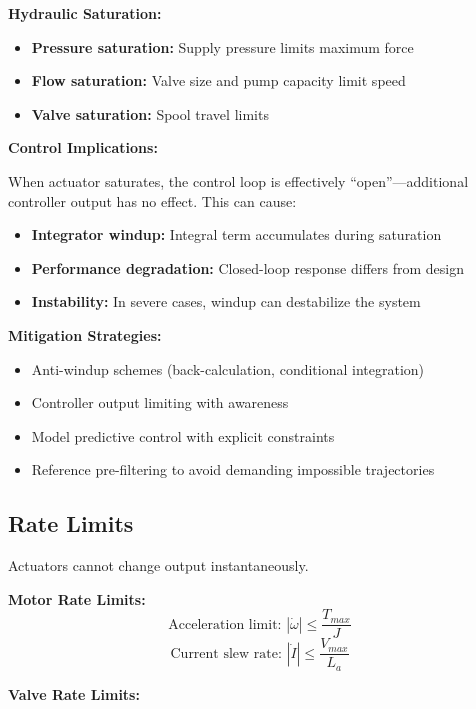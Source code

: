 \textbf{Hydraulic Saturation:}
\begin{itemize}
    \item \textbf{Pressure saturation:} Supply pressure limits maximum force
    \item \textbf{Flow saturation:} Valve size and pump capacity limit speed
    \item \textbf{Valve saturation:} Spool travel limits
\end{itemize}

\textbf{Control Implications:}

When actuator saturates, the control loop is effectively ``open''---additional controller output has no effect. This can cause:
\begin{itemize}
    \item \textbf{Integrator windup:} Integral term accumulates during saturation
    \item \textbf{Performance degradation:} Closed-loop response differs from design
    \item \textbf{Instability:} In severe cases, windup can destabilize the system
\end{itemize}

\textbf{Mitigation Strategies:}
\begin{itemize}
    \item Anti-windup schemes (back-calculation, conditional integration)
    \item Controller output limiting with awareness
    \item Model predictive control with explicit constraints
    \item Reference pre-filtering to avoid demanding impossible trajectories
\end{itemize}

\subsection{Rate Limits}

Actuators cannot change output instantaneously.

\textbf{Motor Rate Limits:}
\begin{equation}
    \text{Acceleration limit: } |\dot{\omega}| \leq \frac{T_{max}}{J}
\end{equation}
\begin{equation}
    \text{Current slew rate: } |\dot{I}| \leq \frac{V_{max}}{L_a}
\end{equation}

\textbf{Valve Rate Limits:}

